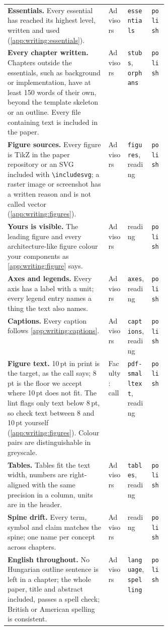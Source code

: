 {\begin{xltabular}{\linewidth}{X >{\raggedright\arraybackslash}p{0.12\linewidth} >{\raggedright\arraybackslash}p{0.15\linewidth} >{\raggedright\arraybackslash}p{0.1\linewidth}}
  \textbf{Essentials.} Every essential has reached its highest level, written and used (\cref{app:writing:essentials}). & Advisors & \texttt{essentials} & \texttt{polish} \\
  \textbf{Every chapter written.} Chapters outside the essentials, such as background or implementation, have at least 150 words of their own, beyond the template skeleton or an outline. Every file containing text is included in the paper. & Advisors & \texttt{stubs}, \texttt{orphans} & \texttt{polish} \\
  \textbf{Figure sources.} Every figure is TikZ in the paper repository or an SVG included with \texttt{\textbackslash includesvg}; a raster image or screenshot has a written reason and is not called vector (\cref{app:writing:figures}). & Advisors & \texttt{figures}, reading & \texttt{polish} \\
  \textbf{Yours is visible.} The leading figure and every architecture-like figure colour your components as \cref{app:writing:figure} says. & Advisors & reading & \texttt{polish} \\
  \textbf{Axes and legends.} Every axis has a label with a unit; every legend entry names a thing the text also names. & Advisors & \texttt{axes}, reading & \texttt{polish} \\
  \textbf{Captions.} Every caption follows \cref{app:writing:captions}. & Advisors & \texttt{captions}, reading & \texttt{polish} \\
  \textbf{Figure text.} 10\,pt in print is the target, as the call says; 8\,pt is the floor we accept where 10\,pt does not fit. The lint flags only text below 8\,pt, so check text between 8 and 10\,pt yourself (\cref{app:writing:figures}). Colour pairs are distinguishable in greyscale. & Faculty: call & \texttt{pdf-smalltext}, reading & \texttt{polish} \\
  \textbf{Tables.} Tables fit the text width, numbers are right-aligned with the same precision in a column, units are in the header. & Advisors & \texttt{tables}, reading & \texttt{polish} \\
  \textbf{Spine drift.} Every term, symbol and claim matches the spine; one name per concept across chapters. & Advisors & reading & \texttt{polish} \\
  \textbf{English throughout.} No Hungarian outline sentence is left in a chapter; the whole paper, title and abstract included, passes a spell check; British or American spelling is consistent. & Advisors & \texttt{language}, \texttt{spelling} & \texttt{polish} \\

\end{xltabular}}
